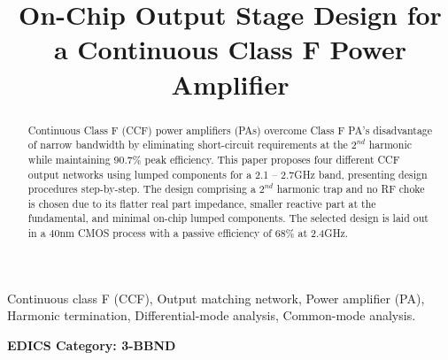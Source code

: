\documentclass[conference]{IEEEtran}
\begin{document}
\title{On-Chip Output Stage Design for a  Continuous Class F Power Amplifier}

\author{ 
}

\maketitle

\begin{abstract}
Continuous Class F (CCF) power amplifiers (PAs) overcome Class F PA's disadvantage of narrow bandwidth by eliminating short-circuit requirements at the $2^{nd}$ harmonic while maintaining 90.7\% peak efficiency. This paper proposes four different CCF output networks using lumped components for a 2.1 -- 2.7GHz band, presenting design procedures step-by-step. The design comprising a $2^{nd}$ harmonic trap and no RF choke is chosen due to its  flatter real part impedance, smaller reactive part at the fundamental, and  minimal on-chip lumped components. The selected design is laid out in a 40nm CMOS process with a passive efficiency of 68\% at 2.4GHz.
\end{abstract}

\vspace{1mm}
\begin{IEEEkeywords}
Continuous class F (CCF), Output matching network, Power amplifier (PA), Harmonic termination, Differential-mode analysis, Common-mode analysis. 
\end{IEEEkeywords}


\ifCLASSOPTIONpeerreview
\begin{center} \bfseries EDICS Category: 3-BBND \end{center}
\fi

\IEEEpeerreviewmaketitle
\end{document}
